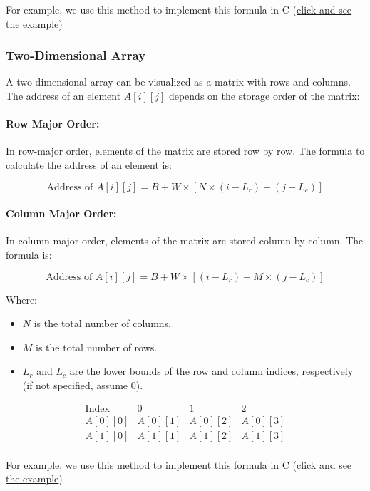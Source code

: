 \documentclass[12pt, oneside]{book}
\begin{document}
For example, we use this method to implement this formula in C (\href{https://github.com/m-mdy-m/Arliz/blob/main/AddressCalculation/one-dimensional.c}{click and see the example})

\subsubsection{Two-Dimensional Array}

A two-dimensional array can be visualized as a matrix with rows and columns. The address of an element \( A[i][j] \) depends on the storage order of the matrix:

\paragraph{Row Major Order:}

In row-major order, elements of the matrix are stored row by row. The formula to calculate the address of an element is:

\[
\text{Address of } A[i][j] = B + W \times \left[ N \times (i - L_r) + (j - L_c) \right]
\]

\paragraph{Column Major Order:}

In column-major order, elements of the matrix are stored column by column. The formula is:

\[
\text{Address of } A[i][j] = B + W \times \left[ (i - L_r) + M \times (j - L_c) \right]
\]

Where:
\begin{itemize}
	\item \( N \) is the total number of columns.
	\item \( M \) is the total number of rows.
	\item \( L_r \) and \( L_c \) are the lower bounds of the row and column indices, respectively (if not specified, assume 0).
\end{itemize}

\[
\begin{array}{c|c|c|c}
	\text{Index} & 0 & 1 & 2 \\
	\hline
	A[0][0] & A[0][1] & A[0][2] & A[0][3] \\
	\hline
	A[1][0] & A[1][1] & A[1][2] & A[1][3] \\
\end{array}
\]

For example, we use this method to implement this formula in C (\href{https://github.com/m-mdy-m/Arliz/blob/main/AddressCalculation/Two-Dimensional.c}{click and see the example})
\end{document}
